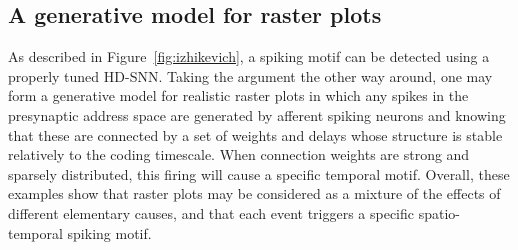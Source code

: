 \documentclass[runningheads]{llncs}
\begin{document}
\subsection{A generative model for raster plots}

As described in Figure~\ref{fig:izhikevich}, a spiking motif can be detected using a properly tuned HD-SNN. Taking the argument the other way around, one may form a generative model for realistic raster plots in which any spikes in the presynaptic address space are generated by afferent spiking neurons and knowing that these are connected by a set of weights and delays whose structure is stable relatively to the coding timescale. When connection weights are strong and sparsely distributed, this firing will cause a specific temporal motif. Overall, these examples show that raster plots may be considered as a mixture of the effects of different elementary causes, and that each event triggers a specific spatio-temporal spiking motif. 
\end{document}
